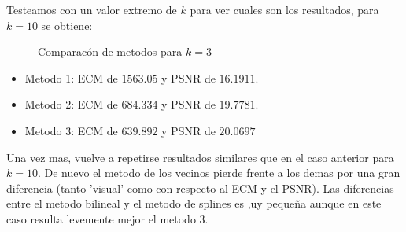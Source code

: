 Testeamos con un valor extremo de $k$ para ver cuales son los resultados, para $k=10$ se obtiene:

\begin{figure}[H]
    \centering
    \qquad
    \qquad
    \caption{Comparacón de metodos para $k = 3$}%
    \label{fig:example}%
\end{figure}

\begin{itemize}
 \item Metodo 1: ECM de $1563.05$ y PSNR de $16.1911$.
 \item Metodo 2: ECM de $684.334$ y PSNR de $19.7781$.
 \item Metodo 3: ECM de $639.892$ y PSNR de $20.0697$
\end{itemize}

Una vez mas, vuelve a repetirse resultados similares que en el caso anterior para $k=10$. De nuevo el metodo de los vecinos pierde frente a los demas por una gran diferencia (tanto 'visual' como con respecto al ECM y el PSNR). Las diferencias entre el metodo bilineal y el metodo de splines es ,uy pequeña aunque en este caso resulta levemente mejor el metodo 3.


